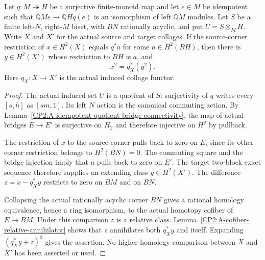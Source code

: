 \begin{lemma}
\label{CP2:A-selected-corner-class-descent}
Let $q:M\twoheadrightarrow H$ be a surjective finite-monoid map
and let $e\in M$ be idempotent such that
$\mathbb QM e\to\mathbb QHq(e)$ is an isomorphism of left
$\mathbb QM$ modules.  Let $S$ be a finite left-$N$, right-$M$
biset, with $BN$ rationally acyclic, and put $U=S\otimes_M H$.
Write $X$ and $X'$ for the actual source and target collages.
If the source-corner restriction of $x\in H^2(X)$ equals
$q^*a$ for some $a\in H^2(BH)$, then there is $y\in H^2(X')$
whose restriction to $BH$ is $a$, and
\[
 x^2=q_X^*(y^2).
\]
Here $q_X:X\to X'$ is the actual induced collage functor.
\end{lemma}
\begin{proof}
The actual induced set $U$ is a quotient of $S$: surjectivity of
$q$ writes every $[s,h]$ as $[sm,1]$.  Its left $N$ action is the
canonical commuting action.  By
Lemma~\ref{CP2:A-idempotent-quotient-bridge-connectivity}, the map
of actual bridges $E\to E'$ is surjective on $H_2$ and therefore
injective on $H^2$ by pullback.

The restriction of $x$ to the source corner pulls back to zero
on $E$, since its other corner restriction belongs to
$H^2(BN)=0$.  The commuting square and the bridge injection imply
that $a$ pulls back to zero on $E'$.  The target two-block exact
sequence therefore supplies an extending class $y\in H^2(X')$.
The difference $z=x-q_X^*y$ restricts to zero on $BM$ and on $BN$.

Collapsing the actual rationally acyclic corner $BN$ gives a
rational homology equivalence, hence a ring isomorphism, to the
actual homotopy cofiber of $E\to BM$.  Under this comparison $z$
is a relative class.  Lemma~\ref{CP2:A-cofiber-relative-annihilator}
shows that $z$ annihilates both $q_X^*y$ and itself.  Expanding
$(q_X^*y+z)^2$ gives the assertion.  No higher-homology comparison
between $X$ and $X'$ has been asserted or used.
\end{proof}

